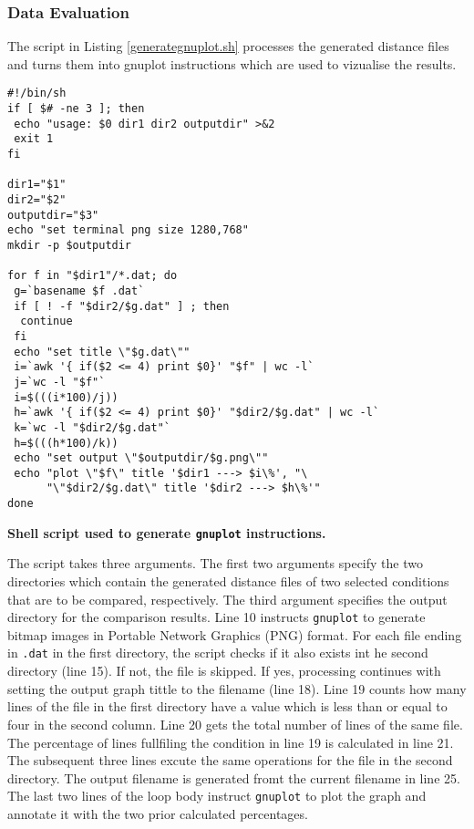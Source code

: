 \documentclass[11pt,twocolumn]{article}
\begin{document}
\subsubsection*{Data Evaluation}

The script in Listing \ref{generategnuplot.sh} processes the generated distance files and turns them into gnuplot instructions which are used to vizualise the results.

\begin{listing}
\begin{verbatim}
#!/bin/sh
if [ $# -ne 3 ]; then 
 echo "usage: $0 dir1 dir2 outputdir" >&2
 exit 1
fi

dir1="$1"
dir2="$2"
outputdir="$3"
echo "set terminal png size 1280,768" 
mkdir -p $outputdir

for f in "$dir1"/*.dat; do
 g=`basename $f .dat`
 if [ ! -f "$dir2/$g.dat" ] ; then 
  continue
 fi
 echo "set title \"$g.dat\""
 i=`awk '{ if($2 <= 4) print $0}' "$f" | wc -l`
 j=`wc -l "$f"`
 i=$(((i*100)/j))
 h=`awk '{ if($2 <= 4) print $0}' "$dir2/$g.dat" | wc -l`
 k=`wc -l "$dir2/$g.dat"`
 h=$(((h*100)/k))
 echo "set output \"$outputdir/$g.png\""
 echo "plot \"$f\" title '$dir1 ---> $i\%', "\
      "\"$dir2/$g.dat\" title '$dir2 ---> $h\%'"
done
\end{verbatim}
\caption{\textbf{Shell script used to generate \texttt{gnuplot} instructions.}}\label{generategnuplot.sh}
\end{listing}

The script takes three arguments. The first two arguments specify the two directories which contain the generated distance files of two selected conditions that are to be compared, respectively. The third argument specifies the output directory for the comparison results. Line 10 instructs \texttt{gnuplot} to generate bitmap images in Portable Network Graphics (PNG) format. For each file ending in \texttt{.dat} in the first directory, the script checks if it also exists int he second directory (line 15). If not, the file is skipped. If yes, processing continues with setting the output graph tittle to the filename (line 18). Line 19 counts how many lines of the file in the first directory have a value which is less than or equal to four in the second column. Line 20 gets the total number of lines of the same file. The percentage of lines fullfiling the condition in line 19 is calculated in line 21. The subsequent three lines excute the same operations for the file in the second directory. The output filename is generated fromt the current filename in line 25. The last two lines of the loop body instruct \texttt{gnuplot} to plot the graph and annotate it with the two prior calculated percentages.  
\end{document}
